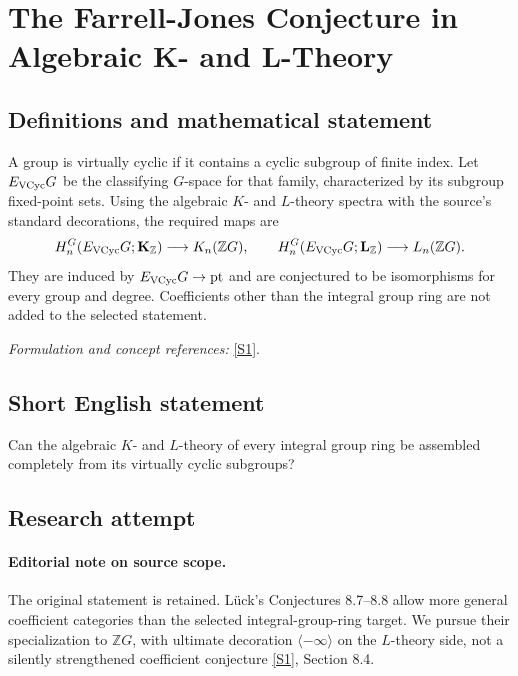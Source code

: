 \documentclass[11pt,a4paper]{article}
\newcommand{\Z}{\mathbb{Z}}
\newcommand{\sref}[2]{\hyperlink{source:#1:#2}{[S#2]}}
\newif\ifshowcatalogue
\newcommand{\cataloguescope}[1]{\ifshowcatalogue
 \paragraph{Exact scope in the supplied catalogue.}
 \begin{quote}\small #1\end{quote}\fi}
\numberwithin{equation}{section}
\begin{document}
\setcounter{section}{67}
\clearpage
\section{\texorpdfstring{The Farrell-Jones Conjecture in Algebraic K- and L-Theory}{The Farrell-Jones Conjecture in Algebraic K- and L-Theory}}\label{68}
\subsection{Definitions and mathematical statement}
A group is virtually cyclic if it contains a cyclic subgroup of finite index. Let $E_{\rm VCyc}G$ be the classifying $G$-space for that family, characterized by its subgroup fixed-point sets. Using the algebraic $K$- and $L$-theory spectra with the source's standard decorations, the required maps are
\[
 H_n^G(E_{\rm VCyc}G;\mathbf K_{\Z})\longrightarrow K_n(\Z G),\qquad
 H_n^G(E_{\rm VCyc}G;\mathbf L_{\Z})\longrightarrow L_n(\Z G).
\]
They are induced by $E_{\rm VCyc}G\to\mathrm{pt}$ and are conjectured to be isomorphisms for every group and degree. Coefficients other than the integral group ring are not added to the selected statement.
\par\smallskip\textit{Formulation and concept references:} \sref{68}{1}.
\cataloguescope{Prove the Farrell-Jones conjecture for every group G: the assembly maps from the equivariant homology of the classifying space for the family of virtually cyclic subgroups to the algebraic K-theory, respectively L-theory, of the group ring \ensuremath{\mathbb Z}G are isomorphisms.}
\subsection{Short English statement}
Can the algebraic $K$- and $L$-theory of every integral group ring be assembled completely from its virtually cyclic subgroups?
\subsection{Research attempt}

\paragraph{Editorial note on source scope.}
The original statement is retained. Lück's Conjectures 8.7--8.8 allow more general coefficient categories than the selected integral-group-ring target. We pursue their specialization to $\Z G$, with ultimate decoration $\langle-\infty\rangle$ on the $L$-theory side, not a silently strengthened coefficient conjecture \sref{68}{1}, Section 8.4.
\end{document}
